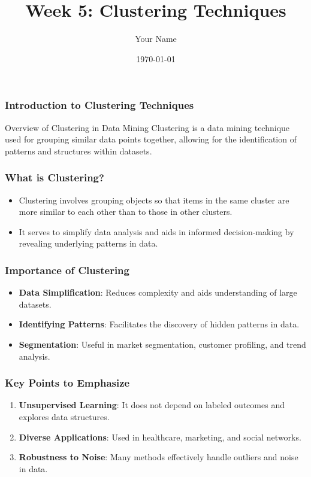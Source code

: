 \documentclass{beamer}
\title{Week 5: Clustering Techniques}
\author{Your Name}
\institute{Your Institution}
\date{\today}
\begin{document}
\frame{\titlepage}

\begin{frame}[fragile]
    \titlepage
\end{frame}

\begin{frame}[fragile]
    \frametitle{Introduction to Clustering Techniques}
    \begin{block}{Overview of Clustering in Data Mining}
        Clustering is a data mining technique used for grouping similar data points together, allowing for the identification of patterns and structures within datasets.
    \end{block}
\end{frame}

\begin{frame}[fragile]
    \frametitle{What is Clustering?}
    \begin{itemize}
        \item Clustering involves grouping objects so that items in the same cluster are more similar to each other than to those in other clusters.
        \item It serves to simplify data analysis and aids in informed decision-making by revealing underlying patterns in data.
    \end{itemize}
\end{frame}

\begin{frame}[fragile]
    \frametitle{Importance of Clustering}
    \begin{itemize}
        \item \textbf{Data Simplification}: Reduces complexity and aids understanding of large datasets.
        \item \textbf{Identifying Patterns}: Facilitates the discovery of hidden patterns in data.
        \item \textbf{Segmentation}: Useful in market segmentation, customer profiling, and trend analysis.
    \end{itemize}
\end{frame}

\begin{frame}[fragile]
    \frametitle{Key Points to Emphasize}
    \begin{enumerate}
        \item \textbf{Unsupervised Learning}: It does not depend on labeled outcomes and explores data structures.
        \item \textbf{Diverse Applications}: Used in healthcare, marketing, and social networks.
        \item \textbf{Robustness to Noise}: Many methods effectively handle outliers and noise in data.
    \end{enumerate}
\end{frame}
\end{document}
